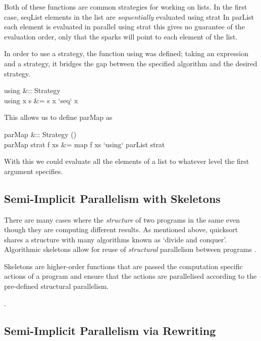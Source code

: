 Both of these functions are common strategies for working on lists. In the first
case, \<seqList\> elements in the list are \emph{sequentially} evaluated
using \<strat\> In \<parList\> each element is evaluated in parallel
using \<strat\> this gives no guarantee of the evaluation order, only that
the sparks will point to each element of the list.

In order to use a strategy, the function \<using\> was defined; taking an
expression and a strategy, it bridges the gap between the specified algorithm
and the desired strategy.

\begin{haskell}
using &:: \hasalpha \to Strategy \hasalpha \to \hasalpha\\
using x s &= s x `seq` x
\end{haskell}

This allows us to define \<parMap\> as

\begin{haskell}
parMap &:: Strategy \hasbeta \to (\hasalpha \to \hasbeta) \to [\hasalpha] \to [\hasbeta]\\
parMap strat f xs &= map f xs `using` parList strat
\end{haskell}

With this we could evaluate all the elements of a list to whatever level the
first argument specifies.

\subsection{Semi-Implicit Parallelism with Skeletons}

There are many cases where the \emph{structure} of two programs in the same
even though they are computing different results. As mentioned above,
\<quicksort\> shares a structure with many algorithms known as `divide and
conquer'. Algorithmic skeletons allow for reuse of \emph{structural} parallelism
between programs .

Skeletons are higher-order functions that are passed the computation specific actions
of a program and ensure that the actions are parallelised according to the pre-defined
structural parallelism.

.

\subsection{Semi-Implicit Parallelism via Rewriting}



